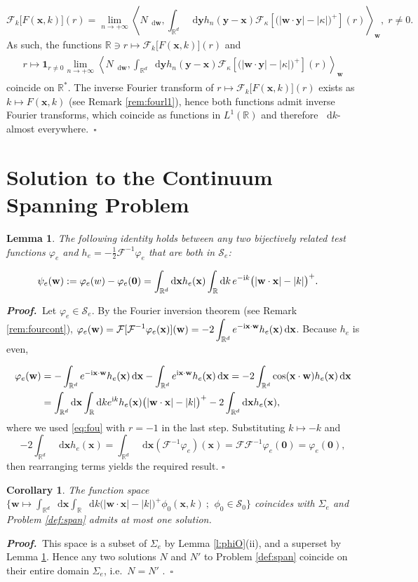 \documentclass[11pt,A4,twoside]{article}
\newcommand\ind{\mathbf{1}}
\numberwithin{equation}{section}
\renewcommand{\b}[1]{{\color{blue}#1}}
\newcommand{\F}{\mathcal{F}}
\renewcommand*\d{\mathop{}\!\mathrm{d}}
\newcommand{\inner}[1]{\left\langle#1 \right\rangle}
\newcommand{\x}{\mathbf{x}}
\newcommand{\y}{\mathbf{y}}
\newcommand{\w}{\mathbf{w}}
\newcommand{\R}{\mathbbm{R}}
\renewcommand{\S}{\mathcal{S}}
\newcommand{\intRd}{\int_{\R^d}}
\newcommand{\intR}{\int_{\R}}
\def\bel{\begin{eqnarray*}\begin{aligned}}
\def\eel{\end{aligned}\end{eqnarray*}}
\newcommand{\beqa}{\begin{eqnarray}}
\newcommand{\eeqa}{\end{eqnarray}}
\def\bal{\begin{aligned}}
\def\eal{\end{aligned}}
\def\bll#1{
\beqa\label{#1}\bal
}\def\lel{\eal\eeqa}
\newcommand{\beql}[1]{\bll{#1}}
\newcommand{\eeql}{\lel}
\newtheorem{corollary}[theorem]{Corollary}
\newtheorem{lemma}[theorem]{Lemma}
\theoremstyle{definition}
\theoremstyle{remark}
\def\sp{,\;}
\def\R{\mathbb{R}}
\def\varphie{\varphi_e}
\def\finproof {$\Box$ \vskip 5 pt }\def\finproof{\rule{4pt}{6pt}}\def\finproof{\ensuremath{\square}}
\def\proof{\noindent \emph{\textbf{Proof.} $\, $}}
\def\theh{\b{h}}\def\theh{h}
\def\thermi{{\rm i}}%
\begin{document}
{\[
  \F_k \big[F(\x,k)\big](r) = \lim_{n\to+\infty
  } \inner{N_{\d \w}, \intRd \d\y  \theh_n(\y-\x)
  \F_\kappa\left[ \big(|\w \cdot \y | - |\kappa|\big)^+ \right](r) }_{\w}
  \sp r\neq 0.
\]
As such, the functions $\R \ni r \mapsto \F_k \big[F(\x,k)\big](r)$
and
\bel%
    r \mapsto \ind_{r\neq 0} \lim_{n\to+\infty
  }
  \inner{N_{\d \w}, \intRd \d\y  \theh_n(\y-\x)
  \F_\kappa\left[ \big(|\w \cdot \y | - |\kappa|\big)^+ \right](r) }_{\w} 
    \eel 
coincide on $\R^*$. The inverse Fourier transform of  $ r \mapsto \F_k \big[F(\x,k)\big](r)$ exists as $k \mapsto F(\x,k)$ (see Remark \ref{rem:fourl1}}), hence both functions admit inverse Fourier transforms, which coincide as functions in $L^1(\R)$ and therefore $\d k$-almost everywhere.\ \finproof
 
 \section{Solution to the Continuum Spanning Problem}\label{s:th}

  \begin{lemma} \label{l:pf}
The following identity holds between any two bijectively related test functions $\varphie$ and $\theh_e={-\frac{1}{2}}\F^{-1}\varphie$ that are both in $\S_e$: %
\beql{e:df}
&   \psi_e(\w) := \varphie(w) - \varphie(\mathbf 0) = 
 \intRd \d\x  \theh_e(\x) \int_\R  \d k  \,e^{-\thermi k}  \big(|\w\cdot\x| -| k|\big)^+   .
\eeql 
\end{lemma} 
\proof Let $\varphie \in\S_e$.  By the Fourier inversion theorem (see Remark \ref{rem:fourcont}), $\displaystyle
\varphie (\w) = \F [\F^{-1} \varphie(\x)](\w) =-2 \int_{\R^d} e^{-\thermi   \x \cdot\w} \theh_e(\x) \d \x
$.  Because $h_e$ is even,
\beql{e:lm1}
\varphie (\w) &= - \int_{\R^d} e^{-\thermi   \x \cdot\w} \theh_e(\x) \d \x -  \int_{\R^d} e^{\thermi  \x \cdot\w} \theh_e(\x) \d \x
 =- 2\int_{\R^d} \cos( \x \cdot\w) \theh_e(\x) \d \x\\
& =  \intRd \d \x  \int_{\R}  \d k e^{\thermi k} \theh_e(\x) \big(|\w \cdot \x | - |k |\big)^+  - 2 
\intRd \d\x    \theh_e( \x) ,\eeql
where we used \eqref{eq:fou} with $r =- 1$ in the last step.  Substituting $k \mapsto -k$ and 
\[
   -2 \intRd \d\x    \theh_e( \x) =\intRd \d\x   (  \F^{-1}\varphie)( \x)= \F\F^{-1}\varphie (\mathbf 0)= \varphie (\mathbf 0),
\]
then rearranging terms yields the required result. \finproof


\begin{corollary}\label{c:uniq} The function space
 $\{\w\mapsto \intRd \d\x \intR  \d k \big(|\w \cdot \x | - |k |\big)^+ \phi_0 (\x,k)\ ; \ \,   \phi_0\in\S_0\}$ coincides with $\Sigma_e$ and
Problem \ref{def:span} 
 admits at most one solution.
\end{corollary}
\proof This space is a subset of $\Sigma_e$ by Lemma \ref{l:phiO}(ii), and a superset by Lemma \ref{l:pf}. Hence any two solutions $N$ and $N'$ to Problem \ref{def:span} coincide on their entire domain $\Sigma_e$, i.e.\ $N=N'$%
.\ \finproof
 
\end{document}
